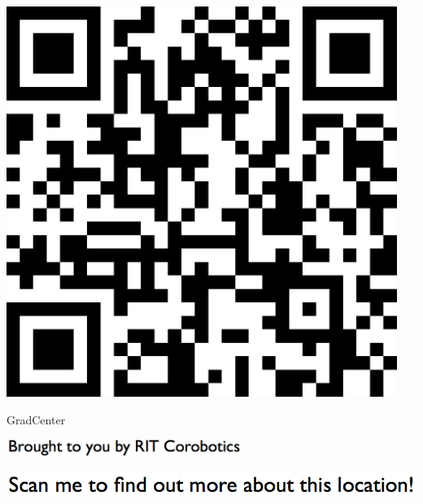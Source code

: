 \documentclass[letterpaper]{article}
\begin{document}
 \begingroup 
 \centerline{\includegraphics[scale=1,width=5in,height=5in]{GradCenter.png}} 
 \endgroup 
 \vspace*{\fill} 

 \hfill{\small GradCenter} 

  \vspace{0.7in} 
 
 \centerline{\includegraphics[scale=1,width=3in]{text-bottom.png}} 
 
 \pagebreak 
{} 
 \vspace*{\fill} 
 
  \centerline{\includegraphics[scale=1,width=6in]{text-top.png}} 
 
 \vspace{0.5in} 
 
\end{document}
